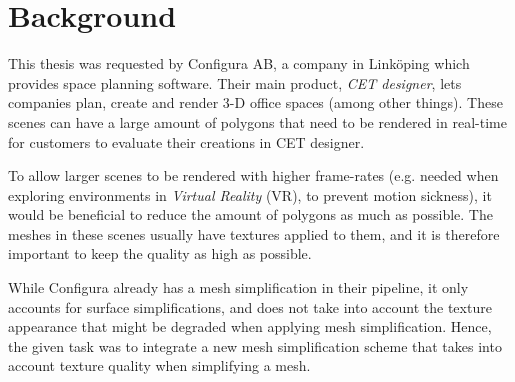\section{Background}
\label{sec:background}

This thesis was requested by Configura AB, a company in Linköping which provides space planning software. Their main product, \emph{CET designer}, lets companies plan, create and render 3-D office spaces (among other things). These scenes can have a large amount of polygons that need to be rendered in real-time for customers to evaluate their creations in CET designer.

To allow larger scenes to be rendered with higher frame-rates (e.g. needed when exploring environments in \emph{Virtual Reality} (VR), to prevent motion sickness), it would be beneficial to reduce the amount of polygons as much as possible. The meshes in these scenes usually have textures applied to them, and it is therefore important to keep the quality as high as possible.

While Configura already has a mesh simplification in their pipeline, it only accounts for surface simplifications, and does not take into account the texture appearance that might be degraded when applying mesh simplification. Hence, the given task was to integrate a new mesh simplification scheme that takes into account texture quality when simplifying a mesh.



